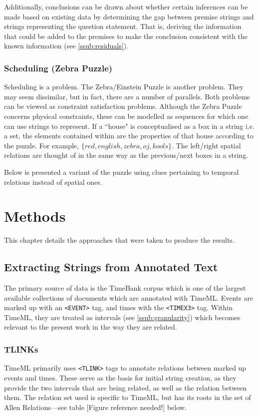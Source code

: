 \documentclass[a4paper,12pt,leqno]{article}
\newcommand{\xmltag}[2][]{\texttt{\textless{}#2#1\textgreater{}}}
\newcommand{\refneeded}[1][]{{\color{red}[Figure reference needed!#1]}}
\begin{document}
Additionally, conclusions can be drawn about whether certain inferences can be made based on existing data by determining the gap between premise strings and strings representing the question statement. That is, deriving the information that could be added to the premises to make the conclusion consistent with the known information (see \ref{ssub:residuals}).

\subsubsection{Scheduling (Zebra Puzzle)}\label{ssub:zebra}
Scheduling is a problem. The Zebra/Einstein Puzzle is another problem. They may seem dissimilar, but in fact, there are a number of parallels. Both problems can be viewed as constraint satisfaction problems. Although the Zebra Puzzle concerns physical constraints, these can be modelled as sequences for which one can use strings to represent. If a ``house" is conceptualised as a box in a string i.e. a set, the elements contained within are the properties of that house according to the puzzle. For example, $\{red, english, zebra, oj, kools\}$. The left/right spatial relations are thought of in the same way as the previous/next boxes in a string.

Below is presented a variant of the puzzle using clues pertaining to temporal relations instead of spatial ones.

\newpage
\section{Methods}\label{sec:methods}
This chapter details the approaches that were taken to produce the results.

\subsection{Extracting Strings from Annotated Text}\label{sub:extracting}
The primary source of data is the TimeBank corpus which is one of the largest available collections of documents which are annotated with TimeML. Events are marked up with an \xmltag{EVENT} tag, and times with the \xmltag{TIMEX3} tag. Within TimeML, they are treated as intervals (see \ref{ssub:granularity}) which becomes relevant to the present work in the way they are related.

\subsubsection{TLINKs}\label{ssub:tlinks}
TimeML primarily uses \xmltag{TLINK} tags to annotate relations between marked up events and times. These serve as the basis for initial string creation, as they provide the two intervals that are being related, as well as the relation between them. The relation set used is specific to TimeML, but has its roots in the set of Allen Relations---see table \refneeded{} below.
\end{document}
